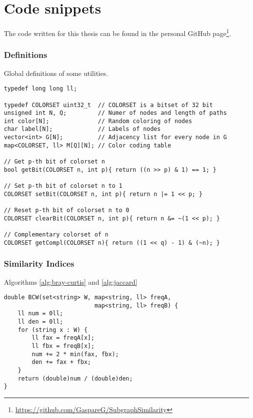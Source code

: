

\chapter{Code snippets}
  
The code written for this thesis can be found in the personal GitHub page\footnote{\url{https://github.com/GaspareG/SubgraphSimilarity}}.\medskip

\subsection*{Definitions}

Global definitions of some utilities.

\begin{lstlisting}
typedef long long ll;

typedef COLORSET uint32_t  // COLORSET is a bitset of 32 bit
unsigned int N, Q;         // Numer of nodes and length of paths
int color[N];              // Random coloring of nodes
char label[N];             // Labels of nodes
vector<int> G[N];          // Adjacency list for every node in G
map<COLORSET, ll> M[Q][N]; // Color coding table

// Get p-th bit of colorset n
bool getBit(COLORSET n, int p){ return ((n >> p) & 1) == 1; }

// Set p-th bit of colorset n to 1
COLORSET setBit(COLORSET n, int p){ return n |= 1 << p; }

// Reset p-th bit of colorset n to 0
COLORSET clearBit(COLORSET n, int p){ return n &= ~(1 << p); }

// Complementary colorset of n
COLORSET getCompl(COLORSET n){ return ((1 << q) - 1) & (~n); }
\end{lstlisting}

\clearpage
\subsection*{Similarity Indices}

Algorithms \ref{alg:bray-curtis} and \ref{alg:jaccard}

\begin{lstlisting}
double BCW(set<string> W, map<string, ll> freqA, 
                          map<string, ll> freqB) {
	ll num = 0ll;
	ll den = 0ll;
	for (string x : W) {
		ll fax = freqA[x];
		ll fbx = freqB[x];
		num += 2 * min(fax, fbx);
		den += fax + fbx;
	}
	return (double)num / (double)den;
}
\end{lstlisting}


